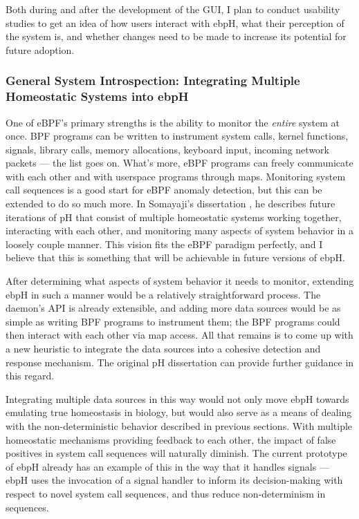 \documentclass[
  12pt]{findlay}
\begin{document}
Both during and after the development of the GUI, I plan to conduct
usability studies to get an idea of how users interact with ebpH, what
their perception of the system is, and whether changes need to be made
to increase its potential for future adoption.

\hypertarget{general-system-introspection-integrating-multiple-homeostatic-systems-into-ebph}{%
\subsubsection{General System Introspection: Integrating Multiple
Homeostatic Systems into
ebpH}\label{general-system-introspection-integrating-multiple-homeostatic-systems-into-ebph}}

\label{general_introspection}

One of eBPF's primary strengths is the ability to monitor the
\emph{entire} system at once. BPF programs can be written to instrument
system calls, kernel functions, signals, library calls, memory
allocations, keyboard input, incoming network packets --- the list goes
on. What's more, eBPF programs can freely communicate with each other
and with userspace programs through maps. Monitoring system call
sequences is a good start for eBPF anomaly detection, but this can be
extended to do so much more. In Somayaji's dissertation
\autocite{soma02}, he describes future iterations of pH that consist of
multiple homeostatic systems working together, interacting with each
other, and monitoring many aspects of system behavior in a loosely
couple manner. This vision fits the eBPF paradigm perfectly, and I
believe that this is something that will be achievable in future
versions of ebpH.

After determining what aspects of system behavior it needs to monitor,
extending ebpH in such a manner would be a relatively straightforward
process. The daemon's API is already extensible, and adding more data
sources would be as simple as writing BPF programs to instrument them;
the BPF programs could then interact with each other via map access. All
that remains is to come up with a new heuristic to integrate the data
sources into a cohesive detection and response mechanism. The original
pH dissertation \autocite{soma02} can provide further guidance in this
regard.

Integrating multiple data sources in this way would not only move ebpH
towards emulating true homeostasis in biology, but would also serve as a
means of dealing with the non-deterministic behavior described in
previous sections. With multiple homeostatic mechanisms providing
feedback to each other, the impact of false positives in system call
sequences will naturally diminish. The current prototype of ebpH already
has an example of this in the way that it handles signals --- ebpH uses
the invocation of a signal handler to inform its decision-making with
respect to novel system call sequences, and thus reduce non-determinism
in sequences.
\end{document}

